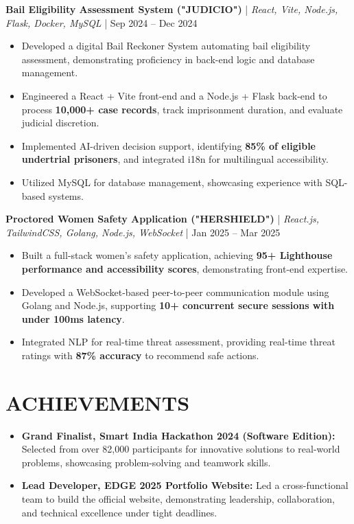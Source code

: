 \documentclass{article}
\begin{document}
\textbf{Bail Eligibility Assessment System ("JUDICIO")} | \textit{React, Vite, Node.js, Flask, Docker, MySQL} | Sep 2024 – Dec 2024
\begin{itemize}[label=$\bullet$]
    \item Developed a digital Bail Reckoner System automating bail eligibility assessment, demonstrating proficiency in back-end logic and database management.
    \item Engineered a React + Vite front-end and a Node.js + Flask back-end to process \textbf{10,000+ case records}, track imprisonment duration, and evaluate judicial discretion.
    \item Implemented AI-driven decision support, identifying \textbf{85\% of eligible undertrial prisoners}, and integrated i18n for multilingual accessibility.
    \item Utilized MySQL for database management, showcasing experience with SQL-based systems.
\end{itemize}

\textbf{Proctored Women Safety Application ("HERSHIELD")} | \textit{React.js, TailwindCSS, Golang, Node.js, WebSocket} | Jan 2025 – Mar 2025
\begin{itemize}[label=$\bullet$]
    \item Built a full-stack women's safety application, achieving \textbf{95+ Lighthouse performance and accessibility scores}, demonstrating front-end expertise.
    \item Developed a WebSocket-based peer-to-peer communication module using Golang and Node.js, supporting \textbf{10+ concurrent secure sessions with under 100ms latency}.
    \item Integrated NLP for real-time threat assessment, providing real-time threat ratings with \textbf{87\% accuracy} to recommend safe actions.
\end{itemize}

\section*{ACHIEVEMENTS}
\begin{itemize}[label=$\bullet$]
    \item \textbf{Grand Finalist, Smart India Hackathon 2024 (Software Edition):} Selected from over 82,000 participants for innovative solutions to real-world problems, showcasing problem-solving and teamwork skills.
    \item \textbf{Lead Developer, EDGE 2025 Portfolio Website:} Led a cross-functional team to build the official website, demonstrating leadership, collaboration, and technical excellence under tight deadlines.
\end{itemize}
\end{document}
